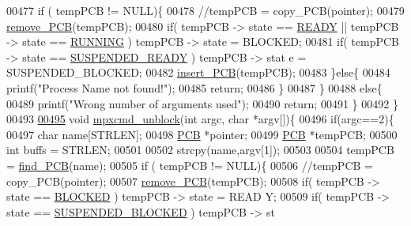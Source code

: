 \begin{DoxyCode}
{00477                 \textcolor{keywordflow}{if} ( tempPCB != NULL)\{
00478                         \textcolor{comment}{//tempPCB = copy\_PCB(pointer);}
00479                         \hyperlink{mpx__r2_8c_af30a3658210d449b4b53e5be2ed2bc2e}{remove_PCB}(tempPCB);
00480                         \textcolor{keywordflow}{if}( tempPCB -> state == \hyperlink{mpx__r2_8h_ad1235d5ce36f7267285e82dccd428aa6}{READY} || tempPCB -> state == 
      \hyperlink{mpx__r2_8h_a6fb7181d994ee98e735494be55809708}{RUNNING} ) tempPCB -> state = BLOCKED;
00481                         \textcolor{keywordflow}{if}( tempPCB -> state == \hyperlink{mpx__r2_8h_a07b1141143e8825b04670da23fca8cc7}{SUSPENDED_READY} ) tempPCB -> stat
      e = SUSPENDED\_BLOCKED;
00482                         \hyperlink{mpx__r2_8c_aa3b334e3a5afd6e590917667ad359a6f}{insert_PCB}(tempPCB);
00483                 \}\textcolor{keywordflow}{else}\{
00484                         printf(\textcolor{stringliteral}{"Process Name not found!"});
00485                         \textcolor{keywordflow}{return};
00486                 \}
00487         \}
00488         \textcolor{keywordflow}{else}\{
00489                 printf(\textcolor{stringliteral}{"Wrong number of arguments used"});       
00490                 \textcolor{keywordflow}{return};
00491         \}       
00492 \}
00493 
\hypertarget{mpx__r2_8c_source_l00495}{}\hyperlink{mpx__r2_8h_a1363a7b6156a84057936c3fd91d91f69}{00495} \textcolor{keywordtype}{void} \hyperlink{mpx__r2_8c_a1363a7b6156a84057936c3fd91d91f69}{mpxcmd_unblock}(\textcolor{keywordtype}{int} argc, \textcolor{keywordtype}{char} *argv[])\{
00496         \textcolor{keywordflow}{if}(argc==2)\{
00497                 \textcolor{keywordtype}{char} name[STRLEN];
00498                 \hyperlink{structprocess}{PCB} *pointer;
00499                 \hyperlink{structprocess}{PCB} *tempPCB;
00500                 \textcolor{keywordtype}{int} buffs = STRLEN;
00501                 
00502                 strcpy(name,argv[1]);
00503                 
00504                 tempPCB = \hyperlink{mpx__r2_8c_a612a6abcb66c688a32f33abc93ff3990}{find_PCB}(name);
00505                 \textcolor{keywordflow}{if} ( tempPCB != NULL)\{
00506                         \textcolor{comment}{//tempPCB = copy\_PCB(pointer);}
00507                         \hyperlink{mpx__r2_8c_af30a3658210d449b4b53e5be2ed2bc2e}{remove_PCB}(tempPCB);
00508                         \textcolor{keywordflow}{if}( tempPCB -> state == \hyperlink{mpx__r2_8h_a48f6457243719e7031768d4100741159}{BLOCKED} ) tempPCB -> state = READ
      Y;
00509                         \textcolor{keywordflow}{if}( tempPCB -> state == \hyperlink{mpx__r2_8h_a6e41bb5a80c5049e8d364bab8ee4d73a}{SUSPENDED_BLOCKED} ) tempPCB -> st
}
\end{DoxyCode}

